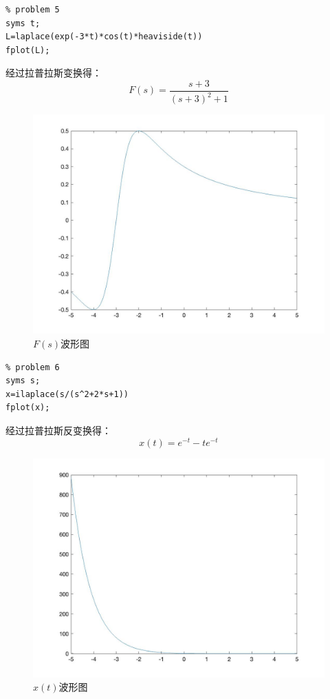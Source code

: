 \documentclass[a4paper,12pt]{ctexart}
\begin{document}
\begin{lstlisting}
% problem 5
syms t;
L=laplace(exp(-3*t)*cos(t)*heaviside(t))
fplot(L);    
\end{lstlisting}
经过拉普拉斯变换得：
\begin{equation}
    F(s)=\frac{s+3}{(s+3)^2+1}
\end{equation}
\begin{figure}[H]
    \centering
    \includegraphics[width=14cm]{5_1.jpg}
    \caption{$F(s)$波形图}
\end{figure}

\begin{lstlisting}
% problem 6
syms s;
x=ilaplace(s/(s^2+2*s+1))
fplot(x);    
\end{lstlisting}
经过拉普拉斯反变换得：
\begin{equation}
    x(t)=e^{-t}-te^{-t}
\end{equation}
\begin{figure}[H]
    \centering
    \includegraphics[width=14cm]{6_1.jpg}
    \caption{$x(t)$波形图}
\end{figure}
\end{document}
